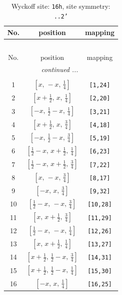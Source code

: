 \documentclass[fleqn,8pt]{jsarticle}
\begin{document}
\renewcommand{\arraystretch}{1.2}
\begin{longtable}{ccc}
\caption{Wyckoff site: {\tt 16h}, site symmetry: {\tt ..2'}}
 \\
 \hline \hline
No. & position & mapping \\ \hline \endfirsthead

\multicolumn{2}{l}{\tablename\ \thetable{}} \\
 \hline \hline
No. & position & mapping \\ \hline \endhead

 \hline \hline
\multicolumn{2}{r}{\footnotesize\it continued ...} \\ \endfoot

 \hline \hline
\multicolumn{2}{r}{} \\ \endlastfoot

1 & $\left[ x,\, - x,\, \frac{1}{4} \right]$ & {\tt [1,24]} \\ \hline
2 & $\left[ x + \frac{1}{2},\, x,\, \frac{1}{4} \right]$ & {\tt [2,20]} \\ \hline
3 & $\left[ - x,\, \frac{1}{2} - x,\, \frac{1}{4} \right]$ & {\tt [3,21]} \\ \hline
4 & $\left[ x + \frac{1}{2},\, x,\, \frac{3}{4} \right]$ & {\tt [4,18]} \\ \hline
5 & $\left[ - x,\, \frac{1}{2} - x,\, \frac{3}{4} \right]$ & {\tt [5,19]} \\ \hline
6 & $\left[ \frac{1}{2} - x,\, x + \frac{1}{2},\, \frac{1}{4} \right]$ & {\tt [6,23]} \\ \hline
7 & $\left[ \frac{1}{2} - x,\, x + \frac{1}{2},\, \frac{3}{4} \right]$ & {\tt [7,22]} \\ \hline
8 & $\left[ x,\, - x,\, \frac{3}{4} \right]$ & {\tt [8,17]} \\ \hline
9 & $\left[ - x,\, x,\, \frac{3}{4} \right]$ & {\tt [9,32]} \\ \hline
10 & $\left[ \frac{1}{2} - x,\, - x,\, \frac{3}{4} \right]$ & {\tt [10,28]} \\ \hline
11 & $\left[ x,\, x + \frac{1}{2},\, \frac{3}{4} \right]$ & {\tt [11,29]} \\ \hline
12 & $\left[ \frac{1}{2} - x,\, - x,\, \frac{1}{4} \right]$ & {\tt [12,26]} \\ \hline
13 & $\left[ x,\, x + \frac{1}{2},\, \frac{1}{4} \right]$ & {\tt [13,27]} \\ \hline
14 & $\left[ x + \frac{1}{2},\, \frac{1}{2} - x,\, \frac{3}{4} \right]$ & {\tt [14,31]} \\ \hline
15 & $\left[ x + \frac{1}{2},\, \frac{1}{2} - x,\, \frac{1}{4} \right]$ & {\tt [15,30]} \\ \hline
16 & $\left[ - x,\, x,\, \frac{1}{4} \right]$ & {\tt [16,25]} \\
\end{longtable}
\end{document}
